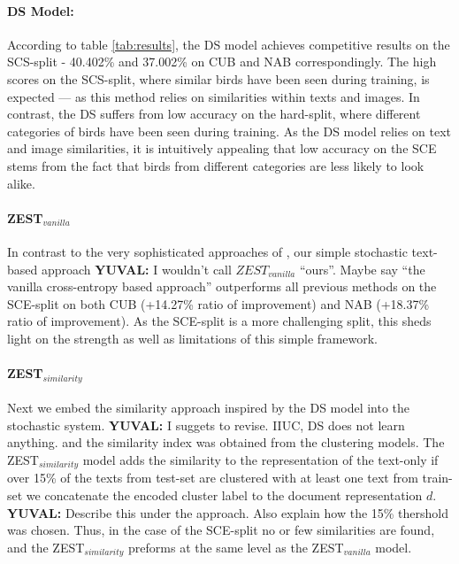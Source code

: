 \documentclass[11pt,a4paper]{article}
\newcommand\yuval[1]{\textcolor{darkpink}{\textbf{YUVAL:} #1 }}
\begin{document}
\paragraph{DS Model:} 
According to table \ref{tab:results}, the DS model achieves competitive results on the SCS-split - 40.402\% and 37.002\% on CUB and NAB correspondingly. The high scores on the SCS-split, where similar birds have been seen during training, is expected --- as this method relies on similarities within texts and images. 
%
In contrast, the DS suffers from low accuracy on the hard-split, where different categories of birds have been seen  during training. As the DS model relies on text and image similarities, it is intuitively appealing that low accuracy on the SCE stems from the fact that birds from different categories are less likely to look alike. 

\paragraph{ZEST$_{vanilla}$}
In contrast to the very sophisticated approaches of \citet{zhu2018generative}, our simple stochastic text-based approach \yuval{I wouldn't call $ZEST_{vanilla}$ ``ours''. Maybe say ``the vanilla cross-entropy based approach''} outperforms all previous methods on the SCE-split on both CUB (+14.27\% ratio of improvement) and NAB (+18.37\%  ratio of improvement). As the SCE-split is a more challenging split, this sheds light on the strength as well as limitations of this simple framework.  

\paragraph{ZEST$_{similarity}$}

Next we embed the similarity approach inspired by the DS model into the stochastic system. %
\yuval{I suggets to revise. IIUC, DS does not learn anything. and the similarity index was obtained from the clustering models.  }
The ZEST$_{similarity}$ model adds the similarity to the representation of the text-only if over 15\% of the texts from test-set are clustered with at least one text from train-set we concatenate the encoded cluster label to the document representation $d$. \yuval{Describe this under the approach. Also explain how the 15\% thershold was chosen.}
Thus, in the case of the SCE-split no or few similarities are found, and the ZEST$_{similarity}$ preforms at the same level as the ZEST$_{vanilla}$ model. 
\end{document}
